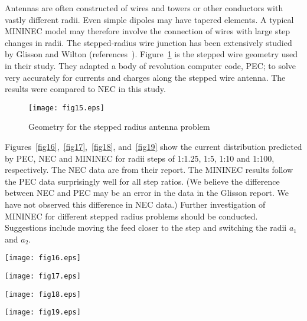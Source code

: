 \documentclass[12pt]{article}
\begin{document}
Antennas are often constructed of wires and towers or other conductors
with vastly different radii. Even simple dipoles may have tapered
elements. A typical MININEC model may therefore involve the connection
of wires with large step changes in radii. The stepped-radius wire
junction has been extensively studied by Glisson and Wilton
(references~\cite{r17}). Figure~\ref{fig15} is the stepped wire geometry
used in their study. They adapted a body of revolution computer code,
PEC; to solve very accurately for currents and charges along the stepped
wire antenna. The results were compared to NEC in this study.

\begin{figure}[htb]
\centerline{\texttt{[image: fig15.eps]}}
\caption{Geometry for the stepped radius antenna problem}
\label{fig15}
\end{figure}

Figures~\ref{fig16},~\ref{fig17},~\ref{fig18}, and~\ref{fig19} show the
current distribution predicted by PEC, NEC and MININEC for radii steps
of 1:1.25, 1:5, 1:10 and 1:100, respectively. The NEC data are from
their report. The MININEC results follow the PEC data surprisingly well
for all step ratios. (We believe the difference between NEC and PEC may
be an error in the data in the Glisson report. We have not observed this
difference in NEC data.) Further investigation of MININEC for different
stepped radius problems should be conducted. Suggestions include moving
the feed closer to the step and switching the radii $a_1$ and $a_2$.

\begin{sidewaysfigure}[htb]
\centerline{\texttt{[image: fig16.eps]}}
\caption{Currents for a stepped radius junction of $a_2/a_1 = 1.25$}
\label{fig16}
\end{sidewaysfigure}

\begin{sidewaysfigure}[htb]
\centerline{\texttt{[image: fig17.eps]}}
\caption{Currents for a stepped radius junction of $a_2/a_1 = 5$}
\label{fig17}
\end{sidewaysfigure}

\begin{sidewaysfigure}[htb]
\centerline{\texttt{[image: fig18.eps]}}
\caption{Currents for a stepped radius junction of $a_2/a_1 = 10$}
\label{fig18}
\end{sidewaysfigure}

\begin{sidewaysfigure}[htb]
\centerline{\texttt{[image: fig19.eps]}}
\caption{Currents for a stepped radius junction of $a_2/a_1 = 100$}
\label{fig19}
\end{sidewaysfigure}
\end{document}
